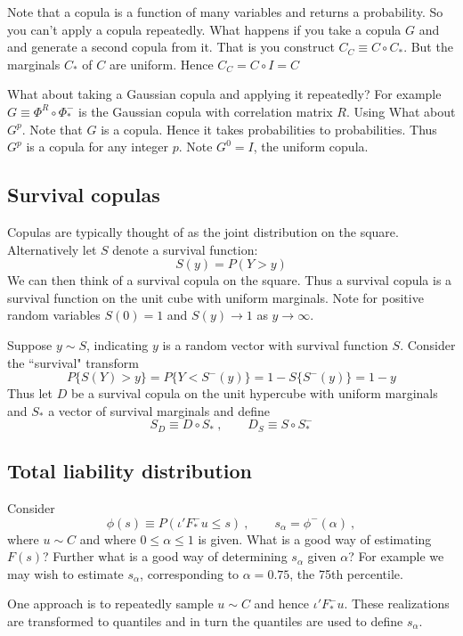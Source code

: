 \documentclass[a4paper,12pt]{article}
\begin{document}
Note that a copula is a function of many variables and returns a probability.  So you can't apply a copula repeatedly.  What happens if you take a copula $G$ and and generate a second copula from it.   That is you construct $C_C\equiv C\circ C_*$.  But the marginals $C_*$ of $C$ are uniform.   Hence $C_C=C\circ I=C$



What about taking a Gaussian copula and applying it repeatedly?   For example $G\equiv \Phi^R\circ\Phi_*^-$ is the Gaussian copula with correlation matrix $R$.  Using    What about $G^p$.  Note that $G$ is a copula.  Hence it takes probabilities to probabilities.   Thus $G^p$ is a copula for any integer $p$.   Note $G^0=I$, the uniform copula.

\subsection*{Survival copulas}

Copulas are typically thought of as the joint distribution on the square.  Alternatively let $S$ denote a survival function:
$$
S(y)=P(Y>y)
$$
We can then think of a survival copula on the square.  Thus a survival copula is a survival function on the unit cube with uniform marginals. Note for positive random variables $S(0)=1$ and $S(y)\rightarrow 1$ as $y\rightarrow\infty$.

Suppose $y\sim S$, indicating $y$ is a random vector with survival function $S$. Consider the ``survival" transform
$$
P\{S(Y)>y\} = P\{Y<S^-(y)\}=1-S\{S^-(y)\}=1-y
$$
Thus let $D$ be a survival copula on the unit hypercube with uniform marginals and $S_*$ a vector of survival marginals and define
$$
S_D\equiv D\circ S_*\ , \qquad D_S\equiv S\circ S_*^-
$$


\subsection*{Total liability distribution}

Consider
$$
\phi(s)\equiv P(\iota'F_*^-u\le s)\ , \qquad s_\alpha=\phi^-(\alpha)\ ,
$$
where $u\sim C$ and where $0\le\alpha\le 1$ is given.
What is a good way of estimating $F(s)$?   Further what is a good way of determining $s_\alpha$ given $\alpha$?  For example we may wish to estimate $s_{\alpha}$, corresponding to $\alpha=0.75$, the 75th percentile.

One approach is to repeatedly sample $u\sim C$ and hence $\iota'F_*^-u$.  These realizations are transformed to quantiles and in turn the quantiles are used to define  $s_\alpha$.
\end{document}
